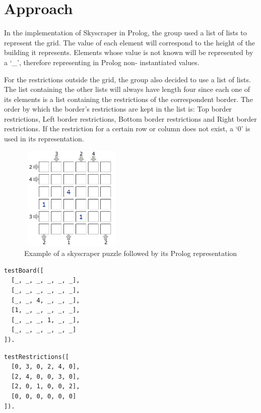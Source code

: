 \documentclass{llncs}
\begin{document}
%
\section{Approach}

In the implementation of Skyscraper in Prolog, the group used a list of lists to represent the grid. The value of each element will correspond to the height of the building it represents.
Elements whose value is not known will be represented by  a `\_', therefore representing in Prolog non- instantiated values.

For the restrictions outside the grid, the group also decided to use a list of lists. The list containing the other lists will always have length four since each one of its elements is a list containing the restrictions of the correspondent border. The order by which the border's restrictions are kept in the list is: Top border restrictions, Left border restrictions, Bottom border restrictions and Right border restrictions. If the restriction for a certain row or column does not exist, a `0' is used in its representation.

\begin{figure}[h!]
\begin{center}
\includegraphics[height=5cm,width=5cm]{images/example_skyscraper.png}
\caption{Example of a skyscraper puzzle followed by its Prolog representation}
\label{Figure 3}
\end{center}
\end{figure}
\noindent\begin{minipage}{.48\textwidth}
\begin{lstlisting}[frame=tlrb, caption=Prolog grid representation]
testBoard([
  [_, _, _, _, _, _],
  [_, _, _, _, _, _],
  [_, _, 4, _, _, _],
  [1, _, _, _, _, _],
  [_, _, _, 1, _, _],
  [_, _, _, _, _, _]
]).
\end{lstlisting}
\end{minipage}\hfill
\begin{minipage}{.42\textwidth}
\begin{lstlisting}[frame=tblr, caption=Prolog representation of border restrictions]
testRestrictions([
  [0, 3, 0, 2, 4, 0],
  [2, 4, 0, 0, 3, 0],
  [2, 0, 1, 0, 0, 2],
  [0, 0, 0, 0, 0, 0]
]).
\end{lstlisting}
\end{minipage}\hfill
\end{document}
